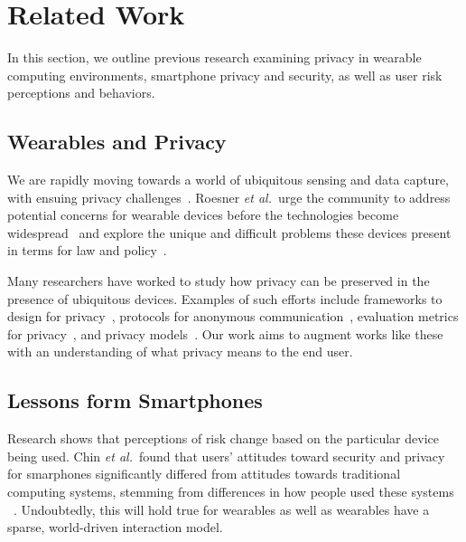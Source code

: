
\section{Related Work}
In this section, we outline previous research examining privacy in wearable computing environments, smartphone privacy and security, as well as user risk perceptions and behaviors.

\subsection{Wearables and Privacy}
We are rapidly moving towards a world of ubiquitous sensing and data capture, with ensuing privacy challenges~\cite{abowd2000charting,palen2003unpacking,camp2000internet}. Roesner {\it et al.}\ urge the community to address potential concerns for wearable devices before the technologies become widespread~\cite{roesner2014security} and explore the unique and difficult problems these devices present in terms for law and policy~\cite{roesner2014augmented}.

Many researchers have worked to study how privacy can be preserved in the presence of ubiquitous devices. Examples of such efforts include frameworks to design for privacy~\cite{bellotti1993design,camp2003designing,langheinrich2001privacy}, protocols for anonymous communication~\cite{cornelius2008anonysense}, evaluation metrics for privacy~\cite{scholtz2004toward}, and privacy models~\cite{hong2004privacy, jiang2002approximate}. Our work aims to augment works like these with an understanding of what privacy means to the end user. 

\subsection{Lessons form Smartphones}
Research shows that perceptions of risk change based on the particular device being used. Chin {\it et al.}\ found that users' attitudes toward security and privacy for smarphones significantly differed from attitudes towards traditional computing systems, stemming from differences in how people used these systems ~\cite{chin2012measuring}. Undoubtedly, this will hold true for wearables as well as wearables have a sparse, world-driven interaction model. 

